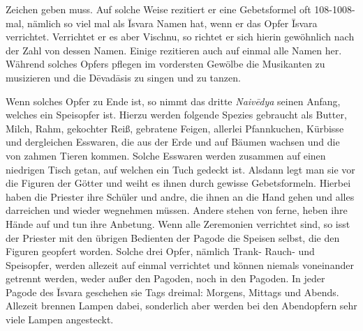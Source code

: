 \documentclass{article}
\begin{document}
Zeichen geben muss. Auf solche Weise rezitiert er eine Gebetsformel oft 108-1008-mal, nämlich so viel mal als \={I}svara Namen hat, wenn er das Opfer \={I}svara verrichtet. Verrichtet er es aber Vischnu, so richtet er sich hierin gewöhnlich nach der Zahl von dessen Namen. Einige rezitieren auch auf einmal alle Namen her. Während solches Opfers pflegen im vordersten Gewölbe die Musikanten zu musizieren und die D\={e}vad\={a}sis zu singen und zu tanzen.

Wenn solches Opfer zu Ende ist, so nimmt das dritte \emph{Naiv\={e}dya} seinen Anfang, welches ein Speisopfer ist. Hierzu werden folgende Spezies gebraucht als Butter, Milch, Rahm, gekochter Reiß, gebratene Feigen, allerlei Pfannkuchen, Kürbisse und dergleichen Esswaren, die aus der Erde und auf Bäumen wachsen und die von zahmen Tieren kommen. Solche Esswaren werden zusammen auf einen niedrigen Tisch getan, auf welchen ein Tuch gedeckt ist. Alsdann legt man sie vor die Figuren der Götter und weiht es ihnen durch gewisse Gebetsformeln. Hierbei haben die Priester ihre Schüler und andre, die ihnen an die Hand gehen und alles darreichen und wieder wegnehmen müssen. Andere stehen von ferne, heben ihre Hände auf und tun ihre Anbetung. Wenn alle Zeremonien verrichtet sind, so isst der Priester mit den übrigen Bedienten der Pagode die Speisen selbst, die den Figuren geopfert worden. Solche drei Opfer, nämlich Trank- Rauch- und Speisopfer, werden allezeit auf einmal verrichtet und können niemals voneinander getrennt werden, weder außer den Pagoden, noch in den Pagoden. In jeder Pagode des \={I}svara geschehen sie Tags dreimal: Morgens, Mittags und Abends. Allezeit brennen Lampen dabei, sonderlich aber werden bei den Abendopfern sehr viele Lampen angesteckt.
\end{document}
